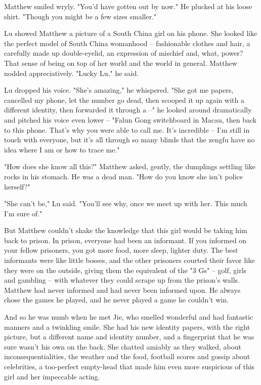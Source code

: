 Matthew smiled wryly. "You'd have gotten out by now." He plucked at
his loose shirt. "Though you might be a few sizes smaller."

Lu showed Matthew a picture of a South China girl on his phone. She
looked like the perfect model of South China womanhood --
fashionable clothes and hair, a carefully made up double-eyelid, an
expression of mischief and, what, power? That sense of being on top
of her world and the world in general. Matthew nodded
appreciatively. "Lucky Lu," he said.

Lu dropped his voice. "She's amazing," he whispered. "She got me
papers, cancelled my phone, let the number go dead, then scooped it
up again with a different identity, then forwarded it through a --"
he looked around dramatically and pitched his voice even lower --
"Falun Gong switchboard in Macau, then back to this phone. That's
why you were able to call me. It's incredible -- I'm still in touch
with everyone, but it's all through so many blinds that the zengfu
have no idea where I am or how to trace me."

"How does she know all this?" Matthew asked, gently, the dumplings
settling like rocks in his stomach. He was a dead man. "How do you
know she isn't police herself?"

"She can't be," Lu said. "You'll see why, once we meet up with her.
This much I'm sure of."

But Matthew couldn't shake the knowledge that this girl would be
taking him back to prison. In prison, everyone had been an
informant. If you informed on your fellow prisoners, you got more
food, more sleep, lighter duty. The best informants were like
little bosses, and the other prisoners courted their favor like
they were on the outside, giving them the equivalent of the "3 Gs"
-- golf, girls and gambling -- with whatever they could scrape up
from the prison's walls. Matthew had never informed and had never
been informed upon. He always chose the games he played, and he
never played a game he couldn't win.

And so he was numb when he met Jie, who smelled wonderful and had
fantastic manners and a twinkling smile. She had his new identity
papers, with the right picture, but a different name and identity
number, and a fingerprint that he was sure wasn't his own on the
back. She chatted amiably as they walked, about
inconsequentialities, the weather and the food, football scores and
gossip about celebrities, a too-perfect empty-head that made him
even more suspicious of this girl and her impeccable acting.

